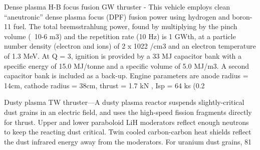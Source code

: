 \documentclass[a4paper]{book}
\begin{document}
Dense plasma H-B focus fusion GW thruster - This vehicle employs clean “aneutronic” dense plasma focus (DPF) fusion power using hydrogen and boron-11 fuel. The total bremsstrahlung power, found by multiplying by the pinch volume (~10-6 m3) and the repetition rate (10 Hz) is 1 GWth, at a particle number density (electron and ions) of 2 x 1022 /cm3 and an electron temperature of 1.3 MeV. At Q = 3, ignition is provided by a 33 MJ capacitor bank with a specific energy of 15.0 MJ/tonne and a specific volume of 5.0 MJ/m3. A second capacitor bank is included as a back-up. Engine parameters are anode radius = 14cm, cathode radius = 38cm, thrust = 1.7 kN , Isp = 64 ks (0.2%
 
Dusty plasma TW thruster––A dusty plasma reactor suspends slightly-critical dust grains in an electric field, and uses the high-speed fission fragments directly for thrust. Upper and lower paraboloid LiH moderators reflect enough neutrons to keep the reacting dust critical. Twin cooled carbon-carbon heat shields reflect the dust infrared energy away from the moderators. For uranium dust grains, 81%
 
\end{document}
